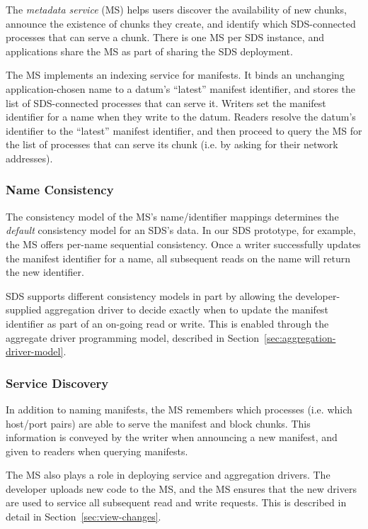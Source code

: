 The \emph{metadata service} (MS) helps users discover the
availability of new chunks, announce the existence of chunks they create, and
identify which SDS-connected processes that can serve a chunk.
There is one MS per SDS instance, and
applications share the MS as part of sharing the SDS deployment.

The MS implements an indexing service for manifests.  It binds an unchanging
application-chosen name to a datum's ``latest'' manifest
identifier, and stores the list of SDS-connected processes that can serve it.
Writers set the manifest identifier for a name when they write to the datum.
Readers resolve the datum's identifier to the ``latest'' manifest identifier,
and then proceed to query the MS for the list of processes that can serve its
chunk (i.e. by asking for their network addresses).

\subsubsection{Name Consistency}

The consistency model of the MS's name/identifier mappings determines the \emph{default}
consistency model for an SDS's data.
In our SDS prototype, for example, the MS offers
per-name sequential consistency.  Once a writer successfully updates the manifest
identifier for a name, all subsequent reads on the name will return the new
identifier.

SDS supports different consistency models in part by allowing the
developer-supplied aggregation driver to decide exactly when to update
the manifest identifier as part of an on-going read or write.
This is enabled through the aggregate driver programming model,
described in Section~\ref{sec:aggregation-driver-model}.

\subsubsection{Service Discovery}

In addition to naming manifests, the MS remembers which processes
(i.e. which host/port pairs) are able to serve the manifest and block chunks.
This information is conveyed by the writer when announcing a new manifest,
and given to readers when querying manifests.

The MS also plays a role in deploying service and aggregation drivers.  The
developer uploads new code to the MS, and the MS ensures that the new drivers
are used to service all subsequent read and write requests.  This is described
in detail in Section~\ref{sec:view-changes}.

